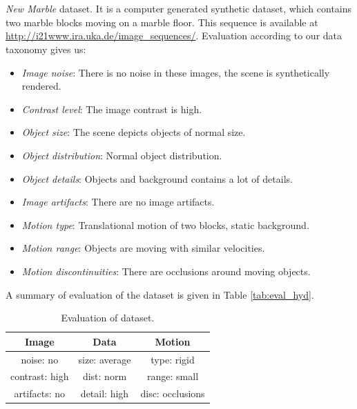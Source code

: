 \\
\\
\textit{New Marble} dataset. It is a computer generated synthetic dataset, which contains two marble blocks moving on a marble floor. This sequence is available at  \url{http://i21www.ira.uka.de/image_sequences/}.
Evaluation according to our data taxonomy gives us:
\begin{itemize}
	\item \textit{Image noise}: There is no noise in these images, the scene is synthetically rendered.
	
	\item \textit{Contrast level}:  The image contrast is high.
	
	\item \textit{Object size}: The scene depicts objects of normal size.
	
	\item \textit{Object distribution}: Normal object distribution.
	
	\item \textit{Object details}: Objects and background  contains a lot of details.
	
	\item \textit{Image artifacts}: There are no image  artifacts.
	
	\item \textit{Motion type}: Translational motion of two blocks, static background. 
	
	\item \textit{Motion range}: Objects are moving with similar velocities.
	
	\item \textit{Motion discontinuities}: There are occlusions around moving objects.
\end{itemize}
A summary of evaluation of the \hyd dataset is given in Table \ref{tab:eval_hyd}.
\begin{table}[ht] \footnotesize
\centering
\caption{Evaluation of \mar dataset.}
\begin{tabular}{ccc}
\toprule
\textbf{Image} & \textbf{Data}   & \textbf{Motion}   \\ 
\midrule
\cellcolor{good} noise: no      	    & \cellcolor{good} size: average  		& \cellcolor{good} type: rigid   \\ 
\cellcolor{good} contrast: high  	& \cellcolor{good} dist: norm     	& \cellcolor{good} range: small  \\ 
\cellcolor{good} artifacts: no       & \cellcolor{good} detail: high 	&  \cellcolor{norm} disc: occlusions   \\ 
\bottomrule
\end{tabular}
\label{tab:eval_mar}%
\end{table}

